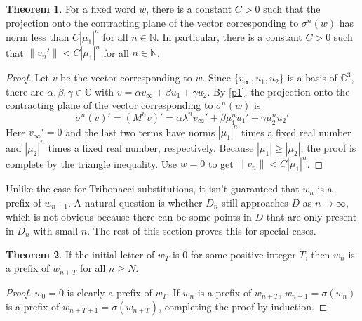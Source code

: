 \documentclass{article}
\theoremstyle{definition}
\newtheorem{theorem}{Theorem}
\begin{document}
\begin{theorem}
\label{t1}
For a fixed word $w$, there is a constant $C>0$ such that the projection onto the contracting plane of the vector corresponding to $\sigma^n(w)$ has norm less than $C|\mu_1|^n$ for all $n\in \mathbb{N}$. In particular, there is a constant $C>0$ such that $\|v_n'\| <C|\mu_1|^n$ for all $n\in \mathbb{N}$.
\end{theorem}
\begin{proof}
Let $v$ be the vector corresponding to $w$. Since $\{v_\infty, u_1, u_2\}$ is a basis of $\mathbb{C}^3$, there are $\alpha, \beta,\gamma\in\mathbb{C}$ with $v=\alpha v_\infty +\beta u_1+\gamma u_2$. By \cref{p1}, the projection onto the contracting plane of the vector corresponding to $\sigma^n(w)$ is 
\[
\sigma^n(v)'=(M^nv)'=\alpha\lambda^nv_\infty'+\beta\mu_1^nu_1'+\gamma\mu_2^n u_2'
\]
Here $v_\infty'=0$ and the last two terms have norms $|\mu_1|^n$ times a fixed real number and $|\mu_2|^n$ times a fixed real number, respectively. Because $|\mu_1|\geq|\mu_2|$, the proof is complete by the triangle inequality. Use $w=0$ to get $\|v_n\| <C|\mu_1|^n$.
\end{proof}

Unlike the case for Tribonacci substitutions, it isn't guaranteed that $w_n$ is a prefix of $w_{n+1}$. A natural question is whether $D_n$ still approaches $D$ as $n\rightarrow\infty$, which is not obvious because there can be some points in $D$ that are only present in $D_n$ with small $n$. The rest of this section proves this for special cases.

\begin{theorem}
\label{t2}
If the initial letter of $w_T$ is $0$ for some positive integer $T$, then $w_n$ is a prefix of $w_{n+T}$ for all $n\geq N$.
\end{theorem}
\begin{proof}
$w_0=0$ is clearly a prefix of $w_T$. If $w_n$ is a prefix of $w_{n+T}$, $w_{n+1}=\sigma(w_n)$ is a prefix of $w_{n+T+1}=\sigma(w_{n+T})$, completing the proof by induction.
\end{proof}
\end{document}
